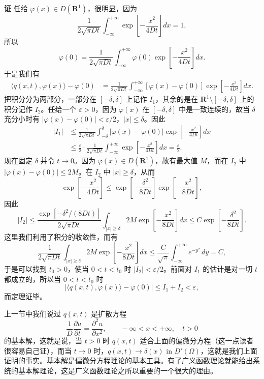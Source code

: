\noindent\textbf{证}
任给 $\varphi(x)\in D(\mathbf R^1)$，很明显，因为
\[
 \frac1{2\sqrt{\pi Dt}}\int_{-\infty}^{+\infty}\exp\!\left[-\frac{x^2}{4Dt}\right]dx=1,
\]
所以
\[
 \varphi(0)=\frac1{2\sqrt{\pi Dt}}\int_{-\infty}^{+\infty}\varphi(0)\exp\!\left[-\frac{x^2}{4Dt}\right]dx.
\]
于是我们有
\[
\begin{aligned}
 \langle q(x,t),\varphi(x)\rangle-\varphi(0)
 &=\frac1{2\sqrt{\pi Dt}}\int_{-\infty}^{+\infty}
 [\varphi(x)-\varphi(0)]\exp\!\left[-\frac{x^2}{4Dt}\right]dx.
\end{aligned}
\]
把积分分为两部分，一部分在 $[-\delta,\delta]$ 上记作 $I_1$，其余的是在 $\mathbf R^1\setminus[-\delta,\delta]$ 上的积分记作 $I_2$。任给一个 $\varepsilon>0$，因为 $\varphi(x)$ 在 $[-\delta,\delta]$ 中是一致连续的，故当 $\delta$ 充分小时有 $|\varphi(x)-\varphi(0)|<\varepsilon/2$，$|x|\le\delta$。因此
\[
\begin{aligned}
 |I_1|&\le\frac1{2\sqrt{\pi Dt}}\int_{-\delta}^{\delta}
 |\varphi(x)-\varphi(0)|\exp\!\left[-\frac{x^2}{4Dt}\right]dx\\
 &\le\frac\varepsilon2\cdot\frac1{2\sqrt{\pi Dt}}
 \int_{-\infty}^{+\infty}\exp\!\left[-\frac{x^2}{4Dt}\right]dx
 =\frac\varepsilon2.
\end{aligned}
\]
现在固定 $\delta$ 并令 $t\to0$。因为 $\varphi(x)\in D(\mathbf R^1)$，故有最大值 $M$，而在 $I_2$ 中 $|\varphi(x)-\varphi(0)|\le2M$。在 $I_2$ 中 $|x|\ge\delta$，从而
\[
 \exp\!\left[-\frac{x^2}{4Dt}\right]
 \le \exp\!\left[-\frac{\delta^2}{8Dt}\right]
 \exp\!\left[-\frac{x^2}{8Dt}\right],
\]
因此
\[
 |I_2|\le\frac{\exp[-\delta^2/(8Dt)]}{2\sqrt{\pi Dt}}
 \int_{|x|\ge\delta}2M\exp\!\left[-\frac{x^2}{8Dt}\right]dx
 \le C\exp\!\left[-\frac{\delta^2}{8Dt}\right].
\]
这里我们利用了积分的收敛性，而有
\[
 \frac1{2\sqrt{\pi Dt}}
 \int_{|x|\ge\delta}2M\exp\!\left[-\frac{x^2}{8Dt}\right]dx
 \le\frac C{\sqrt\pi}\int_{-\infty}^{+\infty}e^{-y^2}\,dy=C,
\]
于是可以找到 $t_0>0$，使当 $0<t<t_0$ 时 $|I_2|<\varepsilon/2$。前面对 $I_1$ 的估计是对一切 $t$ 都成立的，所以当 $0<t<t_0$ 时
\[
 |\langle q(x,t),\varphi(x)\rangle-\varphi(0)|\le I_1+I_2<\varepsilon,
\]
而定理证毕。

上一节中我们说过 $q(x,t)$ 是扩散方程
\[
 \frac1D\frac{\partial u}{\partial t}=\frac{\partial^2u}{\partial x^2},
 \qquad -\infty<x<+\infty,\quad t>0
\]
的基本解，这就是说，当 $t>0$ 时 $q(x,t)$ 适合上面的偏微分方程（这一点读者很容易自己证），而当 $t\to0$ 时，$q(x,t)\to\delta(x)$ in $D'(\Omega)$，这就是我们上面证明的事实。基本解是偏微分方程理论的基本工具。有了广义函数理论就能给出系统的基本解理论，这是广义函数理论之所以重要的一个很大的理由。

